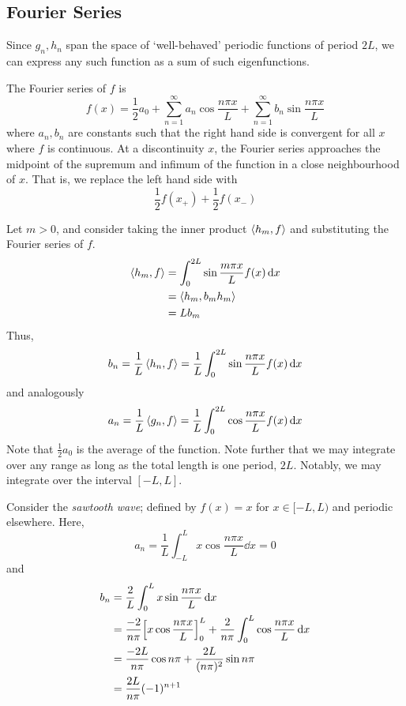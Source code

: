 \subsection{Fourier Series}
Since \( g_n, h_n \) span the space of `well-behaved' periodic functions of period \( 2L \), we can express any such function as a sum of such eigenfunctions.
\begin{definition}
	The Fourier series of \( f \) is
	\[
		f(x) = \frac{1}{2}a_0 + \sum_{n=1}^\infty a_n \cos \frac{n \pi x}{L} + \sum_{n=1}^\infty b_n \sin \frac{n \pi x}{L}
	\]
	where \( a_n, b_n \) are constants such that the right hand side is convergent for all \( x \) where \( f \) is continuous.
	At a discontinuity \( x \), the Fourier series approaches the midpoint of the supremum and infimum of the function in a close neighbourhood of \( x \).
	That is, we replace the left hand side with
	\[
		\frac{1}{2}f(x_+) + \frac{1}{2}f(x_-)
	\]
\end{definition}
\noindent Let \( m > 0 \), and consider taking the inner product \( \left\langle{h_m, f}\right\rangle \) and substituting the Fourier series of \( f \).
\begin{align*}
	\left\langle{h_m, f}\right\rangle & = \int_0^{2L} \sin\frac{m \pi x}{L} f(x) \dd{x} \\
	               & = \left\langle{h_m, b_m h_m}\right\rangle                          \\
	               & = L b_m
\end{align*}
Thus,
\[
	b_n = \frac{1}{L} \left\langle{h_n, f}\right\rangle = \frac{1}{L} \int_0^{2L} \sin\frac{n \pi x}{L} f(x) \dd{x}
\]
and analogously
\[
	a_n = \frac{1}{L} \left\langle{g_n, f}\right\rangle = \frac{1}{L} \int_0^{2L} \cos\frac{n \pi x}{L} f(x) \dd{x}
\]
Note that \( \frac{1}{2} a_0 \) is the average of the function.
Note further that we may integrate over any range as long as the total length is one period, \( 2L \).
Notably, we may integrate over the interval \( [-L, L] \).

\begin{example}
	Consider the \textit{sawtooth wave}; defined by \( f(x) = x \) for \( x \in [-L, L) \) and periodic elsewhere.
	Here,
	\[
		a_n = \frac{1}{L} \int_{-L}^L x \cos \frac{n\pi x}{L} \dd{x} = 0
	\]
	and
	\begin{align*}
		b_n & = \frac{2}{L} \int_0^L x \sin \frac{n\pi x}{L} \dd{x}                                                       \\
		    & = \frac{-2}{n\pi} \qty[x \cos \frac{n\pi x}{L}]_0^L + \frac{2}{n\pi} \int_0^L \cos \frac{n \pi x}{L} \dd{x} \\
		    & = \frac{-2L}{n\pi} \cos n \pi + \frac{2L}{(n\pi)^2} \sin n \pi                                              \\
		    & = \frac{2L}{n\pi} (-1)^{n+1}
	\end{align*}
\end{example}

